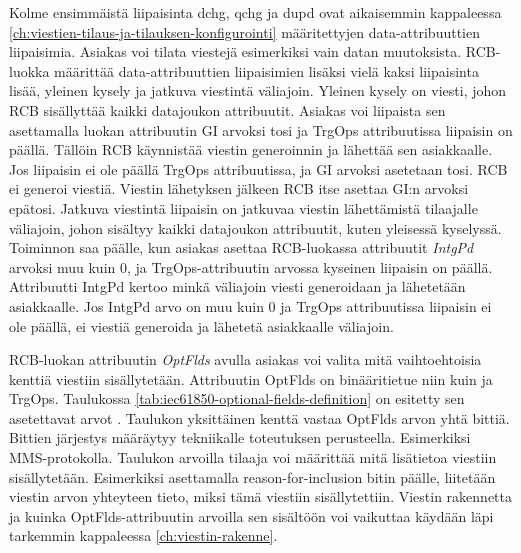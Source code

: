 Kolme ensimmäistä liipaisinta dchg, qchg ja dupd ovat aikaisemmin kappaleessa \ref{ch:viestien-tilaus-ja-tilauksen-konfigurointi} määritettyjen data-attribuuttien liipaisimia. Asiakas voi tilata viestejä esimerkiksi vain datan muutoksista. RCB-luokka määrittää data-attribuuttien liipaisimien lisäksi vielä kaksi liipaisinta lisää, yleinen kysely ja jatkuva viestintä väliajoin. Yleinen kysely on viesti, johon RCB sisällyttää kaikki datajoukon attribuutit. Asiakas voi liipaista sen asettamalla luokan attribuutin GI arvoksi tosi ja TrgOps attribuutissa liipaisin on päällä. Tällöin RCB käynnistää viestin generoinnin ja lähettää sen asiakkaalle. Jos liipaisin ei ole päällä TrgOps attribuutissa, ja GI arvoksi asetetaan tosi. RCB ei generoi viestiä. Viestin lähetyksen jälkeen RCB itse asettaa GI:n arvoksi epätosi. Jatkuva viestintä liipaisin on jatkuvaa viestin lähettämistä tilaajalle väliajoin, johon sisältyy kaikki datajoukon attribuutit, kuten yleisessä kyselyssä. Toiminnon saa päälle, kun asiakas asettaa RCB-luokassa attribuutit \emph{IntgPd} arvoksi muu kuin 0, ja TrgOps-attribuutin arvossa kyseinen liipaisin on päällä. Attribuutti IntgPd kertoo minkä väliajoin viesti generoidaan ja lähetetään asiakkaalle. Jos IntgPd arvo on muu kuin 0 ja TrgOps attribuutissa liipaisin ei ole päällä, ei viestiä generoida ja lähetetä asiakkaalle väliajoin.

RCB-luokan attribuutin \emph{OptFlds} avulla asiakas voi valita mitä vaihtoehtoisia kenttiä viestiin sisällytetään. Attribuutin OptFlds on binääritietue niin kuin ja TrgOps. Taulukossa \ref{tab:iec61850-optional-fields-definition} on esitetty sen asetettavat arvot \mbox{\cite[s.~98]{IEC61850-7-2}}. Taulukon yksittäinen kenttä vastaa OptFlds arvon yhtä bittiä. Bittien järjestys määräytyy tekniikalle toteutuksen perusteella. Esimerkiksi MMS-protokolla. Taulukon arvoilla tilaaja voi määrittää mitä lisätietoa viestiin sisällytetään. Esimerkiksi asettamalla reason-for-inclusion bitin päälle, liitetään viestin arvon yhteyteen tieto, miksi tämä viestiin sisällytettiin. Viestin rakennetta ja kuinka OptFlds-attribuutin arvoilla sen sisältöön voi vaikuttaa käydään läpi tarkemmin kappaleessa \ref{ch:viestin-rakenne}.

